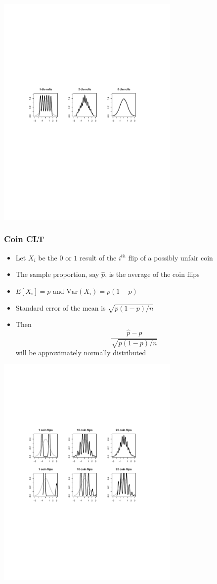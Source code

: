 \documentclass[aspectratio=169]{beamer}
\newcommand{\Var}{\mathrm{Var}}
\begin{document}
\begin{frame}
  \includegraphics[width=3.5in]{die.pdf}
\end{frame}

\begin{frame}\frametitle{Coin CLT}
  \begin{itemize}
  \item Let $X_i$ be the $0$ or $1$ result of the $i^{th}$ flip of a
    possibly unfair coin
  \item The sample proportion, say $\hat p$, is the average of the coin flips
  \item $E[X_i] = p$ and $\Var(X_i) = p(1-p)$
  \item Standard error of the mean is $\sqrt{p(1-p)/n}$
  \item Then
    $$
    \frac{\hat p - p}{\sqrt{p(1-p)/n}}
    $$
    will be approximately normally distributed
  \end{itemize}
\end{frame}

\begin{frame}
\includegraphics[width=3.5in]{coinCLT.pdf}
\end{frame}
\end{document}
